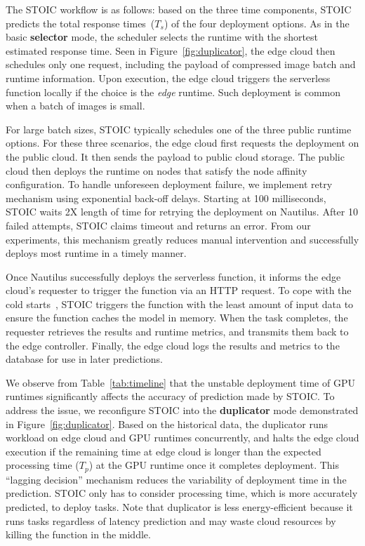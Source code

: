 The STOIC workflow is as follows: based on the three time components, STOIC
predicts the total response times~($T_s$) of the four deployment options. As
in the basic \textbf{selector} mode, the scheduler selects the runtime with
the shortest estimated response time. Seen in Figure~\ref{fig:duplicator}, the
edge cloud then schedules only one request, including the payload of
compressed image batch and runtime information. Upon execution, the edge cloud
triggers the serverless function locally if the choice is the \textit{edge}
runtime. Such deployment is common when a batch of images is small. 

For large batch sizes, STOIC typically schedules one of the three public
runtime options. For these three scenarios, the edge cloud first requests the
deployment on the public cloud. It then sends the payload to public cloud
storage. The public cloud then deploys the runtime on nodes that satisfy the
node affinity configuration. To handle unforeseen deployment failure, we
implement retry mechanism using exponential back-off delays. Starting at 100
milliseconds, STOIC waits 2X length of time for retrying the deployment on
Nautilus. After 10 failed attempts, STOIC claims timeout and returns an error.
From our experiments, this mechanism greatly reduces manual intervention and
successfully deploys most runtime in a timely manner.
 
Once Nautilus successfully deploys the serverless function, it informs the
edge cloud's requester to trigger the function via an HTTP request. To cope
with the cold starts~\cite{ref:coldstart}, STOIC triggers the function with
the least amount of input data to ensure the function caches the model in
memory. When the task completes, the requester retrieves the results and
runtime metrics, and transmits them back to the edge controller. Finally, the
edge cloud logs the results and metrics to the database for use in later
predictions. 

We observe from Table~\ref{tab:timeline} that the unstable deployment time of
GPU runtimes significantly affects the accuracy of prediction made by STOIC.
To address the issue, we reconfigure STOIC into the \textbf{duplicator} mode
demonstrated in Figure~\ref{fig:duplicator}. Based on the historical data, the
duplicator runs workload on edge cloud and GPU runtimes concurrently, and
halts the edge cloud execution if the remaining time at edge cloud is longer
than the expected processing time ($T_p$) at the GPU runtime once it completes
deployment. This ``lagging decision'' mechanism reduces the variability of
deployment time in the prediction. STOIC only has to consider processing time,
which is more accurately predicted, to deploy tasks. Note that duplicator is
less energy-efficient because it runs tasks regardless of latency prediction
and may waste cloud resources by killing the function in the middle. 

